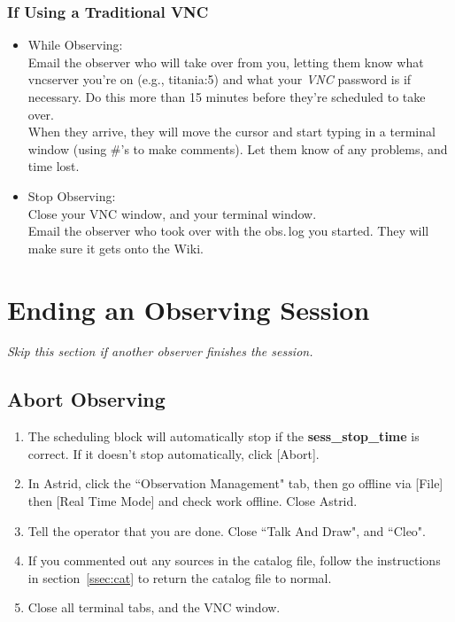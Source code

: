 \documentclass[11pt, reqno, tbtags]{article}
\begin{document}
 \subsubsection{If Using a Traditional VNC} \begin{itemize}
 \item While Observing: \\
 Email the observer who will take over from you, letting them know what vncserver you're on (e.g., titania:5) and what your \textit{VNC} password is if necessary.  Do this more than 15 minutes before they're scheduled to take over.  \\                                                                                               
 When they arrive, they will move the cursor and start typing in a terminal window (using \#'s to make comments).  Let them know of any problems, and time lost.  

 \item Stop Observing: \\
 Close your VNC window, and your terminal window.  \\
 Email the observer who took over with the obs.\,log you started.  They will make sure it gets onto the Wiki.  
\end{itemize}



\section{Ending an Observing Session}  %

\textit{Skip this section if another observer finishes the session.}

\subsection{Abort Observing}\begin{enumerate}  %
 \item The scheduling block will automatically stop if the \textbf{sess\_stop\_time} is correct.  If it doesn't stop automatically, click [Abort].  
 \item In Astrid, click the ``Observation Management" tab, then go offline via [File] then [Real Time Mode] and check work offline.  Close Astrid.  
 \item Tell the operator that you are done.  Close ``Talk And Draw", and ``Cleo".  
 \item If you commented out any sources in the catalog file, follow the instructions in section~\ref{ssec:cat} to return the catalog file to normal.
 \item Close all terminal tabs, and the VNC window. 
\end{enumerate}
\end{document}
